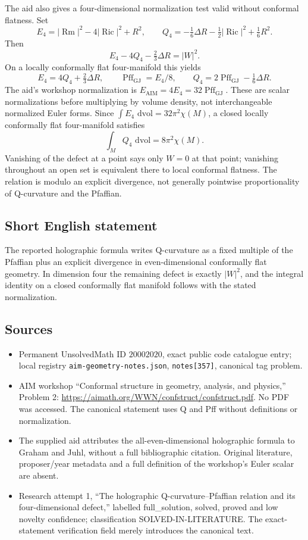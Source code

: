 \documentclass[11pt]{article}
\newcommand{\dd}{\,\mathrm{d}}
\begin{document}
The aid also gives a four-dimensional normalization test valid without conformal flatness. Set
\[
 E_4=|\operatorname{Rm}|^2-4|\operatorname{Ric}|^2+R^2,
 \qquad
 Q_4=-\tfrac16\Delta R-\tfrac12|\operatorname{Ric}|^2+\tfrac16R^2.
\]
Then
\[
 E_4-4Q_4-\tfrac23\Delta R=|W|^2.
\]
On a locally conformally flat four-manifold this yields
\[
 E_4=4Q_4+\tfrac23\Delta R,
 \qquad \operatorname{Pff}_{\mathrm{GJ}}=E_4/8,
 \qquad Q_4=2\operatorname{Pff}_{\mathrm{GJ}}-\tfrac16\Delta R.
\]
The aid's workshop normalization is \(E_{\mathrm{AIM}}=4E_4=32\operatorname{Pff}_{\mathrm{GJ}}\). These are scalar normalizations before multiplying by volume density, not interchangeable normalized Euler forms. Since \(\int E_4\,\dd\mathrm{vol}=32\pi^2\chi(M)\), a closed locally conformally flat four-manifold satisfies
\[
 \int_MQ_4\,\dd\mathrm{vol}=8\pi^2\chi(M).
\]
Vanishing of the defect at a point says only \(W=0\) at that point; vanishing throughout an open set is equivalent there to local conformal flatness. The relation is modulo an explicit divergence, not generally pointwise proportionality of Q-curvature and the Pfaffian.
\subsection{Short English statement}
The reported holographic formula writes Q-curvature as a fixed multiple of the Pfaffian plus an explicit divergence in even-dimensional conformally flat geometry. In dimension four the remaining defect is exactly \(|W|^2\), and the integral identity on a closed conformally flat manifold follows with the stated normalization.
\subsection{Sources}
\begin{itemize}
\item Permanent UnsolvedMath ID \(20002020\), exact public code catalogue entry; local registry \texttt{aim-geometry-notes.json}, \texttt{notes[357]}, canonical tag problem.
\item AIM workshop ``Conformal structure in geometry, analysis, and physics,'' Problem 2: \url{https://aimath.org/WWN/confstruct/confstruct.pdf}. No PDF was accessed. The canonical statement uses Q and Pff without definitions or normalization.
\item The supplied aid attributes the all-even-dimensional holographic formula to Graham and Juhl, without a full bibliographic citation. Original literature, proposer/year metadata and a full definition of the workshop's Euler scalar are absent.
\item Research attempt 1, ``The holographic Q-curvature–Pfaffian relation and its four-dimensional defect,'' labelled full\_solution, solved, proved and low novelty confidence; classification SOLVED-IN-LITERATURE. The exact-statement verification field merely introduces the canonical text.
\end{itemize}
\end{document}
